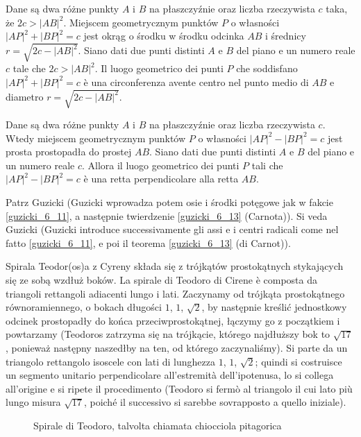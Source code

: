 \begin{proposition}
    Dane są dwa różne punkty $A$ i $B$ na płaszczyźnie oraz liczba rzeczywista $c$ taka, że $2c > |AB|^2$. %
    Miejscem geometrycznym punktów $P$ o własności $|AP|^2 + |BP|^2 = c$ jest okrąg o środku w środku odcinka $AB$ i średnicy $r = \sqrt{2c - |AB|^2}$. %
    Siano dati due punti distinti $A$ e $B$ del piano e un numero reale $c$ tale che $2c>|AB|^2$. %
    Il luogo geometrico dei punti $P$ che soddisfano $|AP|^2+|BP|^2=c$ è una circonferenza avente centro nel punto medio di $AB$ e diametro $r=\sqrt{2c-|AB|^2}$. %
\end{proposition}

\begin{proposition}
    Dane są dwa różne punkty $A$ i $B$ na płaszczyźnie oraz liczba rzeczywista $c$. %
    Wtedy miejscem geometrycznym punktów $P$ o własności $|AP|^2 - |BP|^2 = c$ jest prosta prostopadła do prostej $AB$. %
    Siano dati due punti distinti $A$ e $B$ del piano e un numero reale $c$. %
    Allora il luogo geometrico dei punti $P$ tali che $|AP|^2-|BP|^2=c$ è una retta perpendicolare alla retta $AB$. %
\end{proposition}

Patrz Guzicki \cite[s. 170-173]{guzicki_2021} (Guzicki wprowadza potem osie i środki potęgowe jak w fakcie \ref{guzicki_6_11}, a następnie twierdzenie \ref{guzicki_6_13} (Carnota)). %
Si veda Guzicki \cite[p. 170--173]{guzicki_2021} (Guzicki introduce successivamente gli assi e i centri radicali come nel fatto \ref{guzicki_6_11}, e poi il teorema \ref{guzicki_6_13} (di Carnot)). %

Spirala Teodor(os)a z Cyreny składa się z trójkątów prostokątnych stykających się ze sobą wzdłuż boków. %
La spirale di Teodoro di Cirene è composta da triangoli rettangoli adiacenti lungo i lati. %
Zaczynamy od trójkąta prostokątnego równoramiennego, o bokach długości $1$, $1$, $\sqrt{2}$, by następnie kreślić jednostkowy odcinek prostopadły do końca przeciwprostokątnej, łączymy go z początkiem i powtarzamy (Teodoros zatrzyma się na trójkącie, którego najdłuższy bok to $\sqrt{17}$, ponieważ następny naszedłby na ten, od którego zaczynaliśmy). %
Si parte da un triangolo rettangolo isoscele con lati di lunghezza $1$, $1$, $\sqrt2$; quindi si costruisce un segmento unitario perpendicolare all'estremità dell'ipotenusa, lo si collega all'origine e si ripete il procedimento (Teodoro si fermò al triangolo il cui lato più lungo misura $\sqrt{17}$, poiché il successivo si sarebbe sovrapposto a quello iniziale). %
\begin{figure}[H]\centering

\caption{Spirala Teodor(os)a, zwany czasami ślimakiem pitagorejskim} %
\caption{Spirale di Teodoro, talvolta chiamata chiocciola pitagorica} %
\end{figure}


%